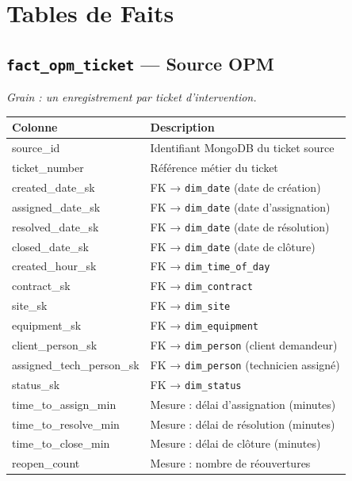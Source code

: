 \documentclass[a4paper,12pt]{article}
\begin{document}
\section{Tables de Faits}

\subsection{\texttt{fact\_opm\_ticket} — Source OPM}

\textit{Grain : un enregistrement par ticket d'intervention.}

\begin{tabularx}{\textwidth}{>{\ttfamily\footnotesize}p{4.5cm} >{\footnotesize}X}
\toprule
\textbf{Colonne} & \textbf{Description} \\
\midrule
source\_id              & Identifiant MongoDB du ticket source \\
ticket\_number          & Référence métier du ticket \\
created\_date\_sk       & FK → \texttt{dim\_date} (date de création) \\
assigned\_date\_sk      & FK → \texttt{dim\_date} (date d'assignation) \\
resolved\_date\_sk      & FK → \texttt{dim\_date} (date de résolution) \\
closed\_date\_sk        & FK → \texttt{dim\_date} (date de clôture) \\
created\_hour\_sk       & FK → \texttt{dim\_time\_of\_day} \\
contract\_sk            & FK → \texttt{dim\_contract} \\
site\_sk                & FK → \texttt{dim\_site} \\
equipment\_sk           & FK → \texttt{dim\_equipment} \\
client\_person\_sk      & FK → \texttt{dim\_person} (client demandeur) \\
assigned\_tech\_person\_sk & FK → \texttt{dim\_person} (technicien assigné) \\
status\_sk              & FK → \texttt{dim\_status} \\
time\_to\_assign\_min   & Mesure : délai d'assignation (minutes) \\
time\_to\_resolve\_min  & Mesure : délai de résolution (minutes) \\
time\_to\_close\_min    & Mesure : délai de clôture (minutes) \\
reopen\_count           & Mesure : nombre de réouvertures \\
\bottomrule
\end{tabularx}
\end{document}

